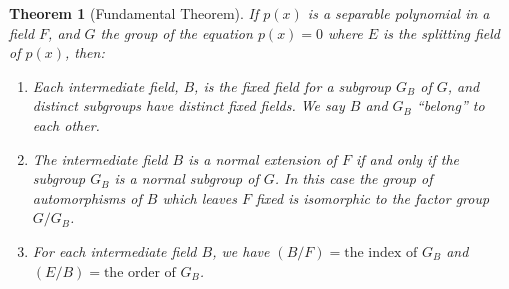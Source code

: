 \documentclass[10pt,leqno]{article}
\newtheorem{theo}{Theorem}
\theoremstyle{definition}
\begin{document}
\begin{theo}[Fundamental Theorem]
\label{theo:onsi}
If $p(x)$ is a separable polynomial in a field $F$, and $G$ the group of the equation $p(x) = 0$ where $E$ is the splitting field of $p(x)$, then:
\begin{enumerate}
\item
Each intermediate field, $B$, is the fixed field for a subgroup $G_B$ of $G$, and distinct subgroups have distinct fixed fields.
We say $B$ and $G_B$ ``belong'' to each other.

\item
The intermediate field $B$ is a normal extension of $F$ if and only if the subgroup $G_B$ is a normal subgroup of $G$.
In this case the group of automorphisms of $B$ which leaves $F$ fixed is isomorphic to the factor group $G/G_B$.

\item
For each intermediate field $B$, we have $(B/F) = \text{the index of $G_B$}$ and $(E/B) = \text{the order of $G_B$}$.
\end{enumerate}
\end{theo}
\end{document}
